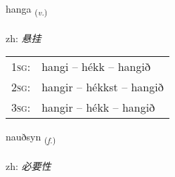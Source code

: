 \documentclass[frontgrid, backgrid]{flacards}\usepackage[]{graphicx}\usepackage[]{color}
\begin{document}
\renewcommand{\blhead}{\vskip5pt {\small\bfseries\footnotesize Sagnorð | 动词 }}
\renewcommand{\bcfoot}{\vskip5pt \hspace{2pt}{\small\bfseries\footnotesize 2K}}


{hanga \small{\textsubscript{(\textit{v.})}} \\[1ex] %
\textphonetic{[hauŋka]} \\
zh: \emph{悬挂} \\  [2ex]
\renewcommand*{\arraystretch}{0.8}
\begin{tabular}{p{1cm}l}
\textsc{1sg}: & hangi -- hékk -- hangið \\ 
\textsc{2sg}: & hangir -- hékkst -- hangið \\ 
\textsc{3sg}: & hangir -- hékk -- hangið \\ 
\end{tabular}
}

\renewcommand{\flhead}{\vskip5pt \fboxsep=0pt {\small\bfseries\footnotesize Nafnorð | 名词}}
\renewcommand{\fcfoot}{\vskip5pt \fboxsep=0pt \hspace{2pt}{\small\bfseries\footnotesize 2K}}

\renewcommand{\blhead}{\vskip5pt {\small\bfseries\footnotesize Nafnorð | 名词 }}
\renewcommand{\bcfoot}{\vskip5pt \hspace{2pt}{\small\bfseries\footnotesize 2K}}


{nauðsyn \small{\textsubscript{(\textit{f.})}} \\[1ex] %
\textphonetic{[nœiðsɪn]} \\
zh: \emph{必要性} \\  [2ex]
\renewcommand*{\arraystretch}{0.8}
}

\renewcommand{\flhead}{\vskip5pt \fboxsep=0pt {\small\bfseries\footnotesize Nafnorð | 名词}}
\renewcommand{\fcfoot}{\vskip5pt \fboxsep=0pt \hspace{2pt}{\small\bfseries\footnotesize 2K}}
\end{document}
